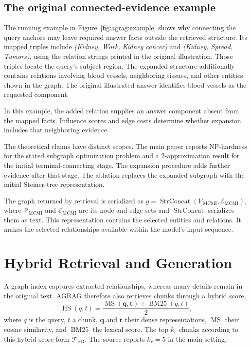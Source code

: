 \subsection{The original connected-evidence example}
The running example in Figure~\ref{fig:agrag:example} shows why connecting the query anchors may leave required answer facts outside the retrieved structure. Its mapped triples include \emph{(Kidney, Work, Kidney cancer)} and \emph{(Kidney, Spread, Tumors)}, using the relation strings printed in the original illustration. Those triples locate the query's subject region. The expanded structure additionally contains relations involving blood vessels, neighboring tissues, and other entities shown in the graph. The original illustrated answer identifies blood vessels as the requested component.

In this example, the added relation supplies an answer component absent from the mapped facts. Influence scores and edge costs determine whether expansion includes that neighboring evidence.

The theoretical claims have distinct scopes. The main paper reports NP-hardness for the stated subgraph optimization problem and a 2-approximation result for the initial terminal-connecting stage. The expansion procedure adds further evidence after that stage. The ablation replaces the expanded subgraph with the initial Steiner-tree representation.

The graph returned by retrieval is serialized as $g=\operatorname{StrConcat}(\mathcal{V}_{\mathrm{MCMI}},\mathcal{E}_{\mathrm{MCMI}})$, where $\mathcal V_{\mathrm{MCMI}}$ and $\mathcal E_{\mathrm{MCMI}}$ are its node and edge sets and $\operatorname{StrConcat}$ serializes them as text. This representation contains the selected entities and relations. It makes the selected relationships available within the model's input sequence.

\section{Hybrid Retrieval and Generation}
\label{sec:agrag:hybrid}
A graph index captures extracted relationships, whereas many details remain in the original text. AGRAG therefore also retrieves chunks through a hybrid score,
\begin{equation}
\operatorname{HS}(q,t)=\frac{\operatorname{MS}(\mathbf{q},\mathbf{t})+
\operatorname{BM25}(q,t)}{2},
\label{eq:agrag:hybrid}
\end{equation}
where $q$ is the query, $t$ a chunk, $\mathbf q$ and $\mathbf t$ their dense representations, $\operatorname{MS}$ their cosine similarity, and $\operatorname{BM25}$ the lexical score. The top $k_r$ chunks according to this hybrid score form $\mathcal{T}_{\mathrm{HR}}$. The source reports $k_r=5$ in the main setting.

